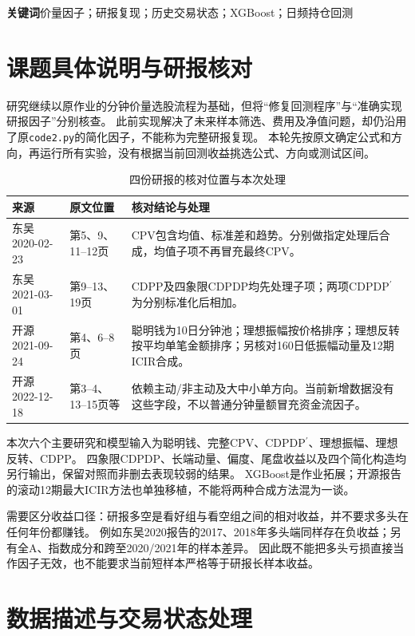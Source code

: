 \documentclass[UTF8,zihao=-4,fontset=fandol]{ctexart}
\begin{document}
\noindent\textbf{关键词}\quad 价量因子；研报复现；历史交易状态；XGBoost；日频持仓回测
\vspace{3mm}\tableofcontents

\clearpage
\section{课题具体说明与研报核对}
研究继续以原作业的分钟价量选股流程为基础，但将“修复回测程序”与“准确实现研报因子”分别核查。
此前实现解决了未来样本筛选、费用及净值问题，却仍沿用了原\texttt{code2.py}的简化因子，不能称为完整研报复现。
本轮先按原文确定公式和方向，再运行所有实验，没有根据当前回测收益挑选公式、方向或测试区间。

\begin{table}[H]\centering\small
\caption{四份研报的核对位置与本次处理}
\begin{tabularx}{\linewidth}{p{27mm}p{29mm}X}\toprule
来源 & 原文位置 & 核对结论与处理\\\midrule
东吴2020-02-23 & 第5、9、11--12页 & CPV包含均值、标准差和趋势。分别做指定处理后合成，均值子项不再冒充最终CPV。\\
东吴2021-03-01 & 第9--13、19页 & CDPP及四象限CDPDP均先处理子项；两项CDPDP$^{\prime}$为分别标准化后相加。\\
开源2021-09-24 & 第4、6--8页 & 聪明钱为10日分钟池；理想振幅按价格排序；理想反转按平均单笔金额排序；另核对160日低振幅动量及12期ICIR合成。\\
开源2022-12-18 & 第3--4、13--15页等 & 依赖主动/非主动及大中小单方向。当前新增数据没有这些字段，不以普通分钟量额冒充资金流因子。\\\bottomrule
\end{tabularx}\end{table}

本次六个主要研究和模型输入为聪明钱、完整CPV、CDPDP$^{\prime}$、理想振幅、理想反转、CDPP。
四象限CDPDP、长端动量、偏度、尾盘收益以及四个简化构造均另行输出，保留对照而非删去表现较弱的结果。
XGBoost是作业拓展；开源报告的滚动12期最大ICIR方法也单独移植，不能将两种合成方法混为一谈。

需要区分收益口径：研报多空是看好组与看空组之间的相对收益，并不要求多头在任何年份都赚钱。
例如东吴2020报告的2017、2018年多头端同样存在负收益；另有全A、指数成分和跨至2020/2021年的样本差异。
因此既不能把多头亏损直接当作因子无效，也不能要求当前短样本严格等于研报长样本收益。

\clearpage
\section{数据描述与交易状态处理}
\end{document}
